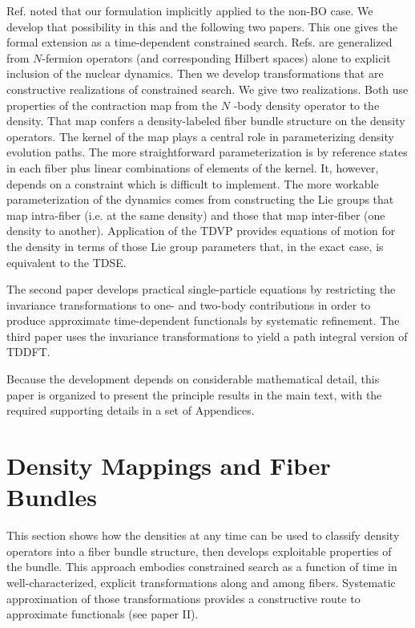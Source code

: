 Ref. \cite{BLWSBT99a} noted that our formulation implicitly applied to the
non-BO case. We develop that possibility in this and the following two
papers. This one gives the formal extension as a time-dependent constrained
search. Refs. \cite{BLWSBT99a,BLWSBT00a} are generalized from $N$-fermion
operators (and corresponding Hilbert spaces) alone to explicit inclusion of
the nuclear dynamics. Then we develop transformations that are constructive
realizations of constrained search. We give two realizations. Both use
properties of the contraction map from the $N$ -body density operator to the
density. That map confers a density-labeled fiber bundle structure on the
density operators. The kernel of the map plays a central role in
parameterizing density evolution paths. The more straightforward
parameterization is by reference states in each fiber plus linear
combinations of elements of the kernel. It, however, depends on a constraint
which is difficult to implement. The more workable parameterization of the
dynamics comes from constructing the Lie groups that map intra-fiber (i.e.
at the same density) and those that map inter-fiber (one density to
another). Application of the TDVP provides equations of motion for the
density in terms of those Lie group parameters that, in the exact case, is
equivalent to the TDSE.

The second paper develops practical single-particle equations by restricting
the invariance transformations to one- and two-body contributions in order
to produce approximate time-dependent functionals by systematic refinement.
The third paper uses the invariance transformations to yield a path integral
version of TDDFT.

Because the development depends on considerable mathematical detail, this
paper is organized to present the principle results in the main text, with
the required supporting details in a set of Appendices.

\section{Density Mappings and Fiber Bundles}

\noindent This section shows how the densities at any time can be used to
classify density operators into a fiber bundle structure, then develops
exploitable properties of the bundle. This approach embodies constrained
search as a function of time in well-characterized, explicit transformations
along and among fibers. Systematic approximation of those transformations
provides a constructive route to approximate functionals (see paper II).

